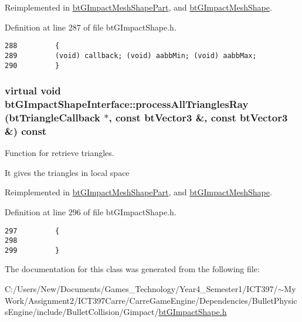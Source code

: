 Reimplemented in \hyperlink{classbt_g_impact_mesh_shape_part_230a814ad9f784638e8bcbf0592cdd39}{btGImpactMeshShapePart}, and \hyperlink{classbt_g_impact_mesh_shape_0b3a0f7b06feb5e2e1fa94f2b5fcd4c7}{btGImpactMeshShape}.

Definition at line 287 of file btGImpactShape.h.

\begin{Code}\begin{verbatim}288         {
289         (void) callback; (void) aabbMin; (void) aabbMax;
290         }
\end{verbatim}
\end{Code}


\hypertarget{classbt_g_impact_shape_interface_646ad13b4aa116d58df110c2f407e5a8}{
\subsubsection[processAllTrianglesRay]{\setlength{\rightskip}{0pt plus 5cm}virtual void btGImpactShapeInterface::processAllTrianglesRay ({\bf btTriangleCallback} $\ast$, \/  const btVector3 \&, \/  const btVector3 \&) const}}
\label{classbt_g_impact_shape_interface_646ad13b4aa116d58df110c2f407e5a8}


Function for retrieve triangles. 

It gives the triangles in local space 

Reimplemented in \hyperlink{classbt_g_impact_mesh_shape_part_0e35b55bd50911911f8164cf3a2dd5c8}{btGImpactMeshShapePart}, and \hyperlink{classbt_g_impact_mesh_shape_80b60d4ca87b2739b2389258e901900d}{btGImpactMeshShape}.

Definition at line 296 of file btGImpactShape.h.

\begin{Code}\begin{verbatim}297         {
298                 
299         }
\end{verbatim}
\end{Code}




The documentation for this class was generated from the following file:\begin{CompactItemize}
\item 
C:/Users/New/Documents/Games\_\-Technology/Year4\_\-Semester1/ICT397/$\sim$My Work/Assignment2/ICT397Carre/CarreGameEngine/Dependencies/BulletPhysicsEngine/include/BulletCollision/Gimpact/\hyperlink{bt_g_impact_shape_8h}{btGImpactShape.h}\end{CompactItemize}
